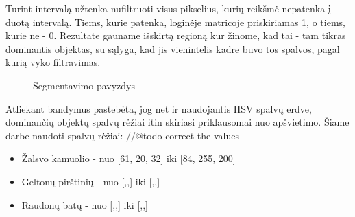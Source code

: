 \documentclass{VUMIFPSbakalaurinis}
\begin{document}
Turint intervalą užtenka nufiltruoti visus pikselius, kurių reikšmė nepatenka į duotą intervalą. Tiems, kurie patenka, loginėje matricoje priskiriamas 1, o tiems, kurie ne - 0. Rezultate gauname išskirtą regioną kur žinome, kad tai - tam tikras dominantis objektas, su sąlyga, kad jis vienintelis kadre buvo tos spalvos, pagal kurią vyko filtravimas. 
\begin{figure}[H]
	\centering
	\qquad
	\caption{Segmentavimo pavyzdys}
	\label{fig:example}
\end{figure}

Atliekant bandymus pastebėta, jog net ir naudojantis HSV spalvų erdve, dominančių objektų spalvų rėžiai itin skiriasi priklausomai nuo apšvietimo. Šiame darbe naudoti spalvų rėžiai: //@todo correct the values

\begin{itemize} 
	\item Žalsvo kamuolio - nuo [61, 20, 32] iki [84, 255, 200]
	\item Geltonų pirštinių - nuo [,,] iki [,,]
	\item Raudonų batų - nuo [,,] iki [,,]
\end{itemize}
\end{document}
